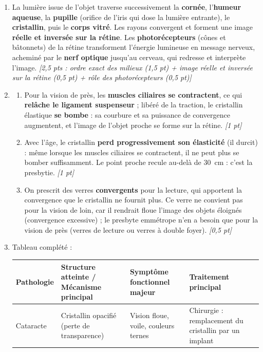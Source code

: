 \documentclass[11pt]{article}
\begin{document}
\begin{corrige}
\begin{enumerate}
\item La lumière issue de l'objet traverse successivement la \textbf{cornée}, l'\textbf{humeur aqueuse}, la \textbf{pupille} (orifice de l'iris qui dose la lumière entrante), le \textbf{cristallin}, puis le \textbf{corps vitré}. Les rayons convergent et forment une image \textbf{réelle et inversée sur la rétine}. Les \textbf{photorécepteurs} (cônes et bâtonnets) de la rétine transforment l'énergie lumineuse en message nerveux, acheminé par le \textbf{nerf optique} jusqu'au cerveau, qui redresse et interprète l'image. \hfill \emph{[2,5 pts : ordre exact des milieux (1,5 pt) + image réelle et inversée sur la rétine (0,5 pt) + rôle des photorécepteurs (0,5 pt)]}
\item \begin{enumerate}
\item Pour la vision de près, les \textbf{muscles ciliaires se contractent}, ce qui \textbf{relâche le ligament suspenseur} ; libéré de la traction, le cristallin élastique \textbf{se bombe} : sa courbure et sa puissance de convergence augmentent, et l'image de l'objet proche se forme sur la rétine. \hfill \emph{[1 pt]}
\item Avec l'âge, le cristallin \textbf{perd progressivement son élasticité} (il durcit) : même lorsque les muscles ciliaires se contractent, il ne peut plus se bomber suffisamment. Le point proche recule au-delà de \SI{30}{cm} : c'est la presbytie. \hfill \emph{[1 pt]}
\item On prescrit des verres \textbf{convergents} pour la lecture, qui apportent la convergence que le cristallin ne fournit plus. Ce verre ne convient pas pour la vision de loin, car il rendrait floue l'image des objets éloignés (convergence excessive) ; le presbyte emmétrope n'en a besoin que pour la vision de près (verres de lecture ou verres à double foyer). \hfill \emph{[0,5 pt]}
\end{enumerate}
\item Tableau complété :
\begin{center}
\begin{tabularx}{\linewidth}{|l|X|X|X|}\hline
\rowcolor{popblueL}
\textbf{Pathologie} & \textbf{Structure atteinte / Mécanisme principal} & \textbf{Symptôme fonctionnel majeur} & \textbf{Traitement principal} \\ \hline
Cataracte & Cristallin opacifié (perte de transparence) & Vision floue, voile, couleurs ternes & Chirurgie : remplacement du cristallin par un implant \\ \hline

\end{tabularx}
\end{center}
\end{enumerate}
\end{corrige}
\end{document}

